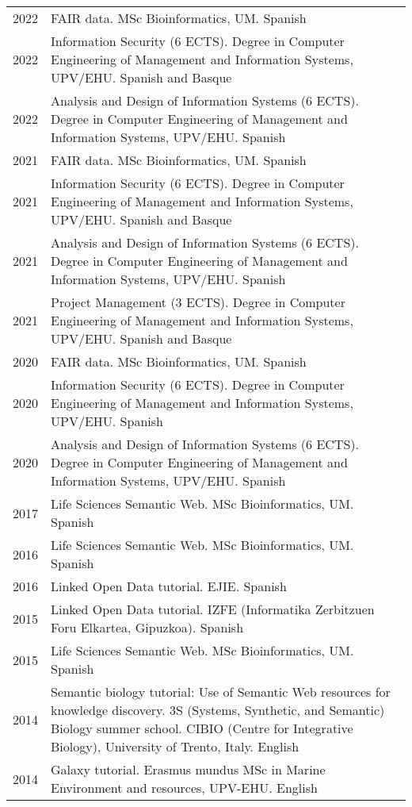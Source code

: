\documentclass[11pt,fullpage]{article}
\begin{document}
\begin{longtable}{p{0.5in}|p{5.5in}}
2022 & FAIR data. MSc Bioinformatics, UM. Spanish \\
2022 & Information Security (6 ECTS). Degree in Computer Engineering of Management and Information Systems, UPV/EHU. Spanish and Basque \\
2022 & Analysis and Design of Information Systems (6 ECTS). Degree in Computer Engineering of Management and Information Systems, UPV/EHU. Spanish \\  
2021 & FAIR data. MSc Bioinformatics, UM. Spanish \\
2021 & Information Security (6 ECTS). Degree in Computer Engineering of Management and Information Systems, UPV/EHU. Spanish and Basque \\
2021 & Analysis and Design of Information Systems (6 ECTS). Degree in Computer Engineering of Management and Information Systems, UPV/EHU. Spanish \\
2021 & Project Management (3 ECTS). Degree in Computer Engineering of Management and Information Systems, UPV/EHU. Spanish and Basque \\
2020 & FAIR data. MSc Bioinformatics, UM. Spanish \\
2020 & Information Security (6 ECTS). Degree in Computer Engineering of Management and Information Systems, UPV/EHU. Spanish \\
2020 & Analysis and Design of Information Systems (6 ECTS). Degree in Computer Engineering of Management and Information Systems, UPV/EHU. Spanish \\
2017 & Life Sciences Semantic Web. MSc Bioinformatics, UM. Spanish \\
2016 & Life Sciences Semantic Web. MSc Bioinformatics, UM. Spanish \\
2016 & Linked Open Data tutorial. EJIE. Spanish \\
2015 & Linked Open Data tutorial. IZFE (Informatika Zerbitzuen Foru Elkartea, Gipuzkoa). Spanish \\
2015 & Life Sciences Semantic Web. MSc Bioinformatics, UM. Spanish \\
2014 & Semantic biology tutorial: Use of Semantic Web resources for knowledge discovery. 3S (Systems, Synthetic, and Semantic) Biology summer school. CIBIO (Centre for Integrative Biology), University of Trento, Italy. English \\
2014 & Galaxy tutorial. Erasmus mundus MSc in Marine Environment and resources, UPV-EHU. English \\

\end{longtable}
\end{document}
